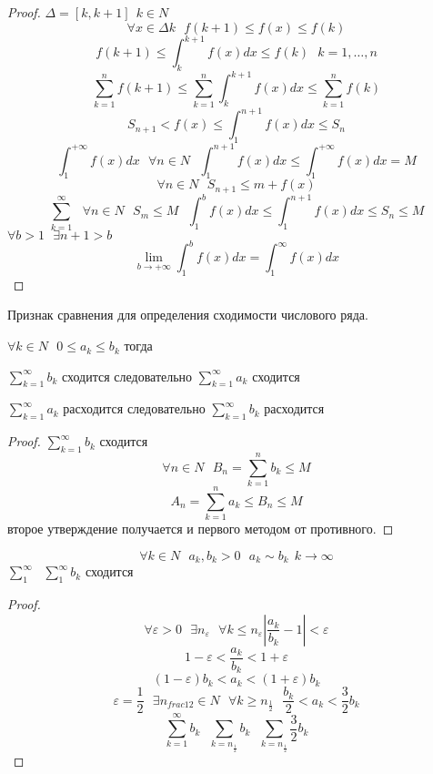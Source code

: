 \begin{proof}
  $\Delta = [k, k+1] ~~ k \in N$
  $$
  \forall x \in \Delta k ~~~ f(k+1) \le f(x) \le f(k)
  $$
  $$
  f(k+1) \le \int_k^{k+1} f(x)dx \le f(k) ~~~ k = 1, \ldots, n
  $$
  $$
  \sum_{k=1}^n f(k+1) \le \sum_{k=1}^n \int_k^{k+1} f(x)dx \le \sum_{k=1}^n f(k)
  $$
  $$
  S_{n+1} < f(x) \le \int_1^{n+1} f(x)dx \le S_n
  $$
  $$
  \int_1^{+\infty} f(x)dx ~~~ \forall n \in N ~~~
  \int_1^{n+1} f(x)dx \le \int_1^{+\infty} f(x) dx = M
  $$
  $$
  \forall n \in N ~~~ S_{n+1} \le m + f(x)
  $$
  $$
  \sum_{k=1}^{\infty} ~~~
  \forall n \in N ~~~
  S_m \le M ~~~
  \int_1^b f(x)dx \le \int_1^{n+1} f(x)dx \le S_n \le M
  $$
  $\forall b>1 ~~~ \exists n+1 > b$
  $$
  \lim_{b \to +\infty} \int_1^b f(x)dx = \int_1^{\infty} f(x)dx
  $$
\end{proof}

\begin{title}
  Признак сравнения для определения сходимости числового ряда.
\end{title}

\begin{theorem}
  $\forall k \in N ~~~ 0 \le a_k \le b_k$ тогда

  $\sum_{k=1}^{\infty} b_k$ сходится следовательно $\sum_{k=1}^{\infty} a_k$
  сходится

  $\sum_{k=1}^{\infty} a_k$ расходится следовательно $\sum_{k=1}^{\infty} b_k$
  расходится
\end{theorem}

\begin{proof}
  $\sum_{k=1}^{\infty} b_k$ сходится
  $$
  \forall n \in N ~~~ B_n = \sum_{k=1}^n b_k \le M
  $$
  $$
  A_n = \sum_{k=1}^n a_k \le B_n \le M
  $$
  второе утверждение получается и первого методом от противного.
\end{proof}

\begin{theorem}
  $$
  \forall k \in N ~~~ a_k, b_k > 0 ~~~ a_k \sim b_k ~~ k \to \infty
  $$
  $\sum_1^{\infty} ~~~ \sum_1^{\infty} b_k$ сходится
\end{theorem}

\begin{proof}
  $$
  \forall \varepsilon > 0 ~~~ \exists n_{\varepsilon} ~~~
  \forall k \le n_{\varepsilon} \left| \frac{a_k}{b_k} -1 \right| < \varepsilon
  $$
  $$
  1 - \varepsilon < \frac{a_k}{b_k} < 1 + \varepsilon
  $$
  $$
  (1 - \varepsilon)b_k < a_k < (1 + \varepsilon)b_k
  $$
  $$
  \varepsilon = \frac{1}{2} ~~~
  \exists n_{frac{1}{2}} \in N ~~~
  \forall k \ge n_{\frac{1}{2}} ~~~
  \frac{b_k}{2} < a_k < \frac{3}{2} b_k
  $$
  $$
  \sum_{k=1}^{\infty} b_k ~~~ \sum_{k=n_{\frac{1}{2}}} b_k ~~~
  \sum_{k=n_{\frac{1}{2}}} \frac{3}{2} b_k
  $$
\end{proof}


